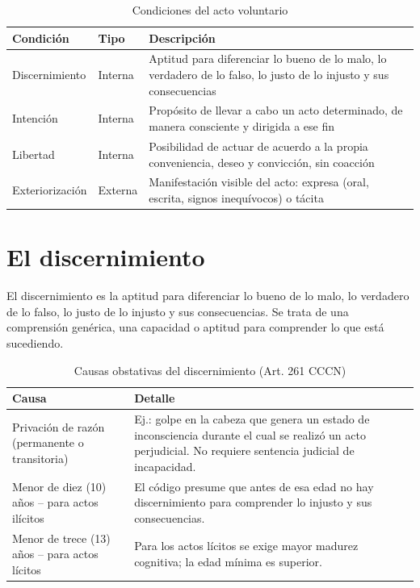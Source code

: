 \documentclass[12pt,oneside]{book}
\begin{document}
\begin{table}[H]
\centering
\caption{Condiciones del acto voluntario}
\begin{tabularx}{\textwidth}{l l X}
\toprule
\textbf{Condición} & \textbf{Tipo} & \textbf{Descripción} \\
\midrule
Discernimiento & Interna & Aptitud para diferenciar lo bueno de lo malo, lo verdadero de lo falso, lo justo de lo injusto y sus consecuencias \\
Intención & Interna & Propósito de llevar a cabo un acto determinado, de manera consciente y dirigida a ese fin \\
Libertad & Interna & Posibilidad de actuar de acuerdo a la propia conveniencia, deseo y convicción, sin coacción \\
Exteriorización & Externa & Manifestación visible del acto: expresa (oral, escrita, signos inequívocos) o tácita \\
\bottomrule
\end{tabularx}
\end{table}

\section{El discernimiento}

El discernimiento es la aptitud para diferenciar lo bueno de lo malo, lo verdadero de lo falso, lo justo de lo injusto y sus consecuencias. Se trata de una comprensión genérica, una capacidad o aptitud para comprender lo que está sucediendo.

\begin{table}[H]
\centering
\caption{Causas obstativas del discernimiento (Art. 261 CCCN)}
\begin{tabularx}{\textwidth}{l X}
\toprule
\textbf{Causa} & \textbf{Detalle} \\
\midrule
Privación de razón (permanente o transitoria) & Ej.: golpe en la cabeza que genera un estado de inconsciencia durante el cual se realizó un acto perjudicial. No requiere sentencia judicial de incapacidad. \\
Menor de diez (10) años -- para actos ilícitos & El código presume que antes de esa edad no hay discernimiento para comprender lo injusto y sus consecuencias. \\
Menor de trece (13) años -- para actos lícitos & Para los actos lícitos se exige mayor madurez cognitiva; la edad mínima es superior. \\
\bottomrule
\end{tabularx}
\end{table}
\end{document}
